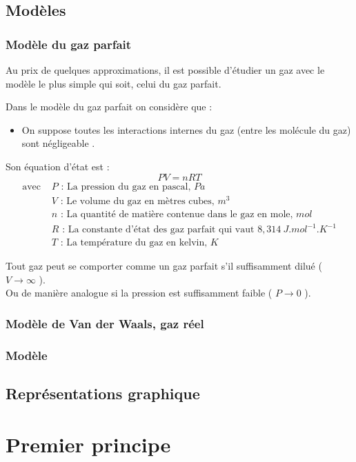 \section{Modèles}
\subsection{Modèle du gaz parfait}
Au prix de quelques approximations, il est possible d'étudier un gaz avec le modèle le plus simple qui soit, celui du gaz parfait.
\begin{defi}
Dans le modèle du gaz parfait on considère que :
\begin{itemize}
    \item On suppose toutes les interactions internes du gaz (entre les molécule du gaz) sont négligeable .
\end{itemize}
Son équation d'état est :
$$PV=nRT$$
\begin{align*}
    \text{avec } & P\text{ : La pression du gaz en pascal, } Pa\\
    & V\text{ : Le volume du gaz en mètres cubes, } m^3\\
    & n\text{ : La quantité de matière contenue dans le gaz en mole, } mol\\
    & R\text{ : La constante d'état des gaz parfait qui vaut } 8,314\ J.mol^{-1}.K^{-1}\\
    & T\text{ : La température du gaz en kelvin, } K
\end{align*}
\end{defi}
\begin{rmq}
Tout gaz peut se comporter comme un gaz parfait s'il suffisamment dilué ( $V\to\infty$ ).\\ Ou de manière analogue si la pression est suffisamment faible ( $P\to 0$ ).
\end{rmq}
\subsection{Modèle de Van der Waals, gaz réel}
\subsection{Modèle}
\section{Représentations graphique}




\chapter{Premier principe}

